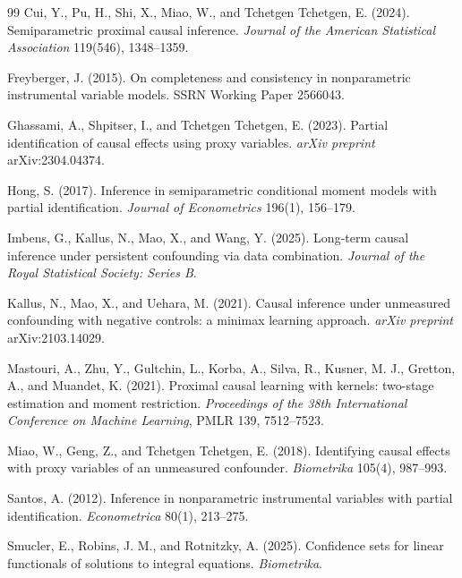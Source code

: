\documentclass[11pt]{article}
\theoremstyle{definition}
\theoremstyle{plain}
\theoremstyle{remark}
\begin{document}
\begin{thebibliography}{99}
Cui, Y., Pu, H., Shi, X., Miao, W., and Tchetgen Tchetgen, E. (2024).
Semiparametric proximal causal inference.
\textit{Journal of the American Statistical Association} 119(546), 1348--1359.

Freyberger, J. (2015).
On completeness and consistency in nonparametric instrumental variable models.
SSRN Working Paper 2566043.

Ghassami, A., Shpitser, I., and Tchetgen Tchetgen, E. (2023).
Partial identification of causal effects using proxy variables.
\textit{arXiv preprint} arXiv:2304.04374.

Hong, S. (2017).
Inference in semiparametric conditional moment models with partial
identification.
\textit{Journal of Econometrics} 196(1), 156--179.

Imbens, G., Kallus, N., Mao, X., and Wang, Y. (2025).
Long-term causal inference under persistent confounding via data combination.
\textit{Journal of the Royal Statistical Society: Series B}.

Kallus, N., Mao, X., and Uehara, M. (2021).
Causal inference under unmeasured confounding with negative controls: a
minimax learning approach.
\textit{arXiv preprint} arXiv:2103.14029.

Mastouri, A., Zhu, Y., Gultchin, L., Korba, A., Silva, R., Kusner, M. J.,
Gretton, A., and Muandet, K. (2021).
Proximal causal learning with kernels: two-stage estimation and moment
restriction.
\textit{Proceedings of the 38th International Conference on Machine Learning},
PMLR 139, 7512--7523.

Miao, W., Geng, Z., and Tchetgen Tchetgen, E. (2018).
Identifying causal effects with proxy variables of an unmeasured confounder.
\textit{Biometrika} 105(4), 987--993.

Santos, A. (2012).
Inference in nonparametric instrumental variables with partial identification.
\textit{Econometrica} 80(1), 213--275.

Smucler, E., Robins, J. M., and Rotnitzky, A. (2025).
Confidence sets for linear functionals of solutions to integral equations.
\textit{Biometrika}.


\end{thebibliography}
\end{document}
